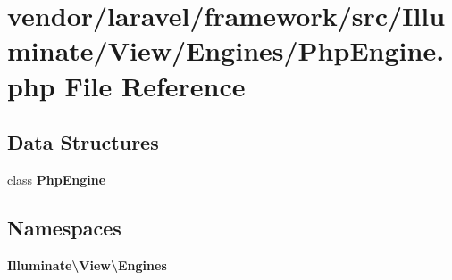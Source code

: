 \section{vendor/laravel/framework/src/\+Illuminate/\+View/\+Engines/\+Php\+Engine.php File Reference}
\label{_php_engine_8php}
\subsection*{Data Structures}
\begin{DoxyCompactItemize}
\item 
class {\bf Php\+Engine}
\end{DoxyCompactItemize}
\subsection*{Namespaces}
\begin{DoxyCompactItemize}
\item 
 {\bf Illuminate\textbackslash{}\+View\textbackslash{}\+Engines}
\end{DoxyCompactItemize}
